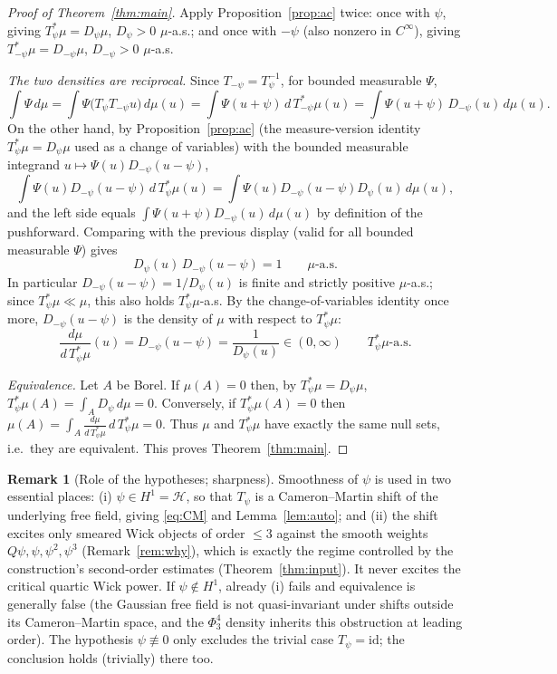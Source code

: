 \documentclass[12pt]{article}
\theoremstyle{plain}
\theoremstyle{definition}
\newtheorem{remark}{Remark}
\begin{document}
\begin{proof}[Proof of Theorem~\ref{thm:main}]
Apply Proposition~\ref{prop:ac} twice: once with $\psi$, giving $T_\psi^\ast\mu=D_\psi\mu$,
$D_\psi>0$ $\mu$-a.s.; and once with $-\psi$ (also nonzero in $C^\infty$), giving
$T_{-\psi}^\ast\mu=D_{-\psi}\mu$, $D_{-\psi}>0$ $\mu$-a.s.

\emph{The two densities are reciprocal.} Since $T_{-\psi}=T_\psi^{-1}$, for bounded
measurable $\Psi$,
\[
\int\Psi\,d\mu=\int\Psi\big(T_\psi T_{-\psi}u\big)\,d\mu(u)
=\int\Psi(u+\psi)\,d\,T_{-\psi}^\ast\mu(u)
=\int\Psi(u+\psi)\,D_{-\psi}(u)\,d\mu(u).
\]
On the other hand, by Proposition~\ref{prop:ac} (the measure-version identity
$T_\psi^\ast\mu=D_\psi\mu$ used as a change of variables) with the bounded measurable
integrand $u\mapsto\Psi(u)D_{-\psi}(u-\psi)$,
\[
\int\Psi(u)D_{-\psi}(u-\psi)\,d\,T_\psi^\ast\mu(u)
=\int\Psi(u)D_{-\psi}(u-\psi)D_\psi(u)\,d\mu(u),
\]
and the left side equals $\int\Psi(u+\psi)D_{-\psi}(u)\,d\mu(u)$ by definition of the
pushforward. Comparing with the previous display (valid for all bounded measurable
$\Psi$) gives
\begin{equation}\label{eq:reciprocal}
D_\psi(u)\,D_{-\psi}(u-\psi)=1\qquad\mu\text{-a.s.}
\end{equation}
In particular $D_{-\psi}(u-\psi)=1/D_\psi(u)$ is finite and strictly positive
$\mu$-a.s.; since $T_\psi^\ast\mu\ll\mu$, this also holds $T_\psi^\ast\mu$-a.s. By the
change-of-variables identity once more, $D_{-\psi}(u-\psi)$ is the density of $\mu$ with
respect to $T_\psi^\ast\mu$:
\[
\frac{d\mu}{d\,T_\psi^\ast\mu}(u)=D_{-\psi}(u-\psi)=\frac1{D_\psi(u)}\in(0,\infty)
\qquad T_\psi^\ast\mu\text{-a.s.}
\]

\emph{Equivalence.} Let $A$ be Borel. If $\mu(A)=0$ then, by
$T_\psi^\ast\mu=D_\psi\mu$, $T_\psi^\ast\mu(A)=\int_A D_\psi\,d\mu=0$. Conversely, if
$T_\psi^\ast\mu(A)=0$ then $\mu(A)=\int_A\frac{d\mu}{d\,T_\psi^\ast\mu}\,d\,T_\psi^\ast\mu=0$.
Thus $\mu$ and $T_\psi^\ast\mu$ have exactly the same null sets, i.e.\ they are
equivalent. This proves Theorem~\ref{thm:main}.
\end{proof}

\begin{remark}[Role of the hypotheses; sharpness]
Smoothness of $\psi$ is used in two essential places: (i) $\psi\in H^1=\mathcal H$, so
that $T_\psi$ is a Cameron--Martin shift of the underlying free field, giving
\eqref{eq:CM} and Lemma~\ref{lem:auto}; and (ii) the shift excites only smeared Wick
objects of order $\le3$ against the smooth weights $Q\psi,\psi,\psi^2,\psi^3$
(Remark~\ref{rem:why}), which is exactly the regime controlled by the construction's
second-order estimates (Theorem~\ref{thm:input}). It never excites the critical
quartic Wick power. If $\psi\notin H^1$, already (i) fails and equivalence is generally
false (the Gaussian free field is not quasi-invariant under shifts outside its
Cameron--Martin space, and the $\Phi^4_3$ density inherits this obstruction at leading
order). The hypothesis $\psi\not\equiv0$ only excludes the trivial case $T_\psi=\mathrm{id}$;
the conclusion holds (trivially) there too.
\end{remark}
\end{document}

